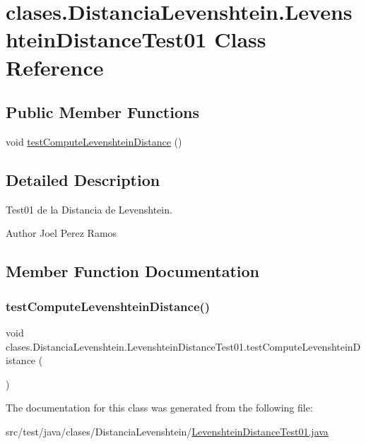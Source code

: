 \hypertarget{classclases_1_1_distancia_levenshtein_1_1_levenshtein_distance_test01}{}\section{clases.\+Distancia\+Levenshtein.\+Levenshtein\+Distance\+Test01 Class Reference}
\label{classclases_1_1_distancia_levenshtein_1_1_levenshtein_distance_test01}
\subsection*{Public Member Functions}
\begin{DoxyCompactItemize}
\item 
void \hyperlink{classclases_1_1_distancia_levenshtein_1_1_levenshtein_distance_test01_aae192451049290eabe6d0ac2e00f254b}{test\+Compute\+Levenshtein\+Distance} ()
\end{DoxyCompactItemize}


\subsection{Detailed Description}
Test01 de la Distancia de Levenshtein. \begin{DoxyAuthor}{Author}
Joel Perez Ramos 
\end{DoxyAuthor}


\subsection{Member Function Documentation}
\hypertarget{classclases_1_1_distancia_levenshtein_1_1_levenshtein_distance_test01_aae192451049290eabe6d0ac2e00f254b}{}\label{classclases_1_1_distancia_levenshtein_1_1_levenshtein_distance_test01_aae192451049290eabe6d0ac2e00f254b} 
\subsubsection{\texorpdfstring{test\+Compute\+Levenshtein\+Distance()}{testComputeLevenshteinDistance()}}
{\footnotesize\ttfamily void clases.\+Distancia\+Levenshtein.\+Levenshtein\+Distance\+Test01.\+test\+Compute\+Levenshtein\+Distance (\begin{DoxyParamCaption}{ }\end{DoxyParamCaption})}



The documentation for this class was generated from the following file\+:\begin{DoxyCompactItemize}
\item 
src/test/java/clases/\+Distancia\+Levenshtein/\hyperlink{_levenshtein_distance_test01_8java}{Levenshtein\+Distance\+Test01.\+java}\end{DoxyCompactItemize}
